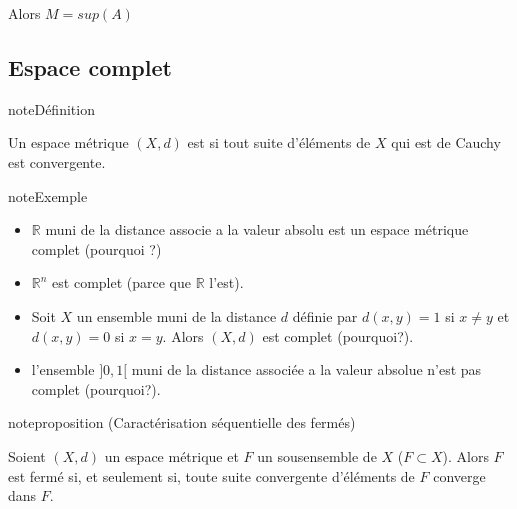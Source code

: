 \documentclass[letterpaper,10pt,french]{sphinxmanual}
\begin{document}
\sphinxAtStartPar
Alors \(M=sup(A)\)


\subsection{Espace complet}
\label{\detokenize{complet:espace-complet}}
\begin{sphinxadmonition}{note}{Définition}

\sphinxAtStartPar
Un espace métrique \((X,d)\) est  si tout suite d’éléments de \(X\) qui est de Cauchy est convergente.
\end{sphinxadmonition}

\begin{sphinxadmonition}{note}{Exemple}
\begin{itemize}
\item {} 
\sphinxAtStartPar
\(\mathbb R\) muni de la distance associe a la valeur absolu est un espace métrique complet (pourquoi ?)

\item {} 
\sphinxAtStartPar
\(\mathbb R^n\) est complet (parce que \(\mathbb R\) l’est).

\item {} 
\sphinxAtStartPar
Soit \(X\) un ensemble muni de la distance \(d\) définie par \(d(x,y)= 1\) si \(x\neq y\) et \(d(x,y)= 0\) si \(x= y\). Alors \((X,d)\) est complet (pourquoi?).

\item {} 
\sphinxAtStartPar
l’ensemble \(]0, 1[\) muni de la distance associée a la valeur absolue n’est pas complet (pourquoi?).

\end{itemize}
\end{sphinxadmonition}

\begin{sphinxadmonition}{note}{proposition (Caractérisation séquentielle des fermés)}

\sphinxAtStartPar
Soient \((X,d)\) un espace métrique et \(F\) un sous\sphinxhyphen{}ensemble de \(X\) (\(F\subset X\)). Alors \(F\) est fermé si, et seulement si, toute suite convergente d’éléments de \(F\) converge dans \(F\).
\end{sphinxadmonition}
\end{document}

